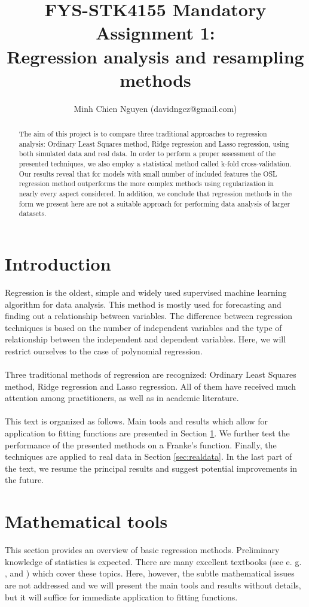 \documentclass [11pt]{article}
\title{FYS-STK4155 Mandatory Assignment 1: \\ Regression analysis and resampling methods}
\author{Minh Chien Nguyen (davidngcz@gmail.com)}
\begin{document}
\maketitle
\nocite{*}
\begin{abstract}
The aim of this project is to compare three traditional approaches to regression analysis: Ordinary Least Squares method, Ridge regression and Lasso regression, using both simulated data and real data. In order to perform a proper assessment of the presented techniques, we also employ a statistical method called k-fold cross-validation. Our results reveal that for models with small number of included features the OSL regression method outperforms the more complex methods using regularization in nearly every aspect considered. In addition, we conclude that regression methods in the form we present here are not a suitable approach for performing data analysis of larger datasets.
\end{abstract}

\section*{Introduction}
Regression is the oldest, simple and widely used supervised machine learning algorithm for data analysis. This method is mostly used for forecasting and finding out a relationship between variables. The difference between regression techniques is based on the number of independent variables and the type of relationship between the independent and dependent variables. Here, we will restrict ourselves to the case of polynomial regression.\\
\\
Three traditional methods of regression are recognized: Ordinary Least Squares method, Ridge regression and Lasso regression. All of them have received much attention among practitioners, as well as in academic literature.\\
\\
This text is organized as follows. Main tools and results which allow for application to fitting functions are presented in Section \ref{sec:techniques}. We further test the performance of the presented methods on a Franke's
function. Finally, the techniques are applied to real data in Section \ref{sec:realdata}. In the last part of the text, we resume the principal results and suggest potential improvements in the future.
\section{Mathematical tools}
\label{sec:techniques}
This section provides an overview of basic regression methods. Preliminary knowledge of statistics is expected. There are many excellent textbooks (see e. g. \cite{abc},\cite{TRJ} and \cite{def}) which cover these topics. Here, however, the subtle mathematical issues are not addressed and we will present the main tools and results without details, but it will suffice for immediate application to fitting functions.\\
\end{document}
